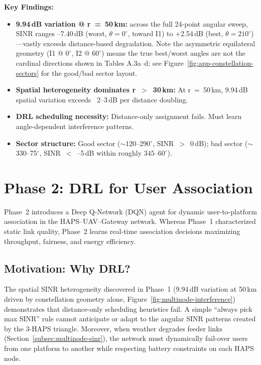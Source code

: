 \documentclass[conference]{IEEEtran}
\begin{document}
\noindent\textbf{Key Findings:}
\begin{itemize}
\item \textbf{9.94\,dB variation @ r~=~50\,km:} across the full 24-point angular sweep, SINR ranges --7.40\,dB (worst, $\theta=0^\circ$, toward I1) to +2.54\,dB (best, $\theta=210^\circ$)—vastly exceeds distance-based degradation. Note the asymmetric equilateral geometry (I1 @ $0^\circ$, I2 @ $60^\circ$) means the true best/worst angles are not the cardinal directions shown in Tables A.3a--d; see Figure~\ref{fig:app-constellation-sectors} for the good/bad sector layout.
\item \textbf{Spatial heterogeneity dominates r~$>$~30\,km:} At r~=~50\,km, 9.94\,dB spatial variation exceeds ~2--3\,dB per distance doubling.
\item \textbf{DRL scheduling necessity:} Distance-only assignment fails. Must learn angle-dependent interference patterns.
\item \textbf{Sector structure:} Good sector ($\sim$120--290$^\circ$, SINR~$>$~0\,dB); bad sector ($\sim$330--75$^\circ$, SINR~$<$~--5\,dB within roughly $345$--$60^\circ$).
\end{itemize}


\section{Phase 2: DRL for User Association}

Phase~2 introduces a Deep Q-Network (DQN) agent for dynamic user-to-platform association in the HAPS--UAV--Gateway network. Whereas Phase~1 characterized static link quality, Phase~2 learns real-time association decisions maximizing throughput, fairness, and energy efficiency.

\subsection{Motivation: Why DRL?}
\label{sec:phase2-motivation}

The spatial SINR heterogeneity discovered in Phase~1 (9.94\,dB variation at 50\,km driven by constellation geometry alone, Figure~\ref{fig:multinode-interference}) demonstrates that distance-only scheduling heuristics fail. A simple ``always pick max SINR'' rule cannot anticipate or adapt to the angular SINR patterns created by the 3-HAPS triangle. Moreover, when weather degrades feeder links (Section~\ref{subsec:multinode-sinr}), the network must dynamically fail-over users from one platform to another while respecting battery constraints on each HAPS node.
\end{document}
